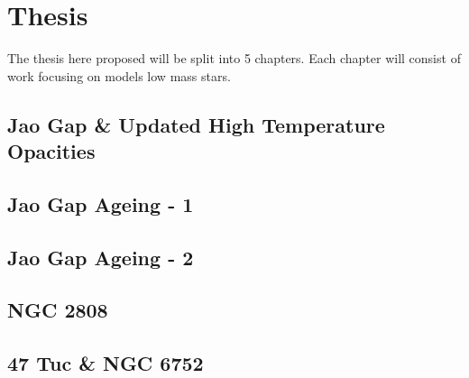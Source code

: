 \section{Thesis}\label{sec:thesis}
The thesis here proposed will be split into 5 chapters. Each chapter will
consist of work focusing on models low mass stars.

\subsection{Jao Gap \& Updated High Temperature Opacities}\label{sec:p1}


\subsection{Jao Gap Ageing - 1}\label{sec:p2}


\subsection{Jao Gap Ageing - 2}\label{sec:p3}


\subsection{NGC 2808}\label{sec:p4}


\subsection{47 Tuc \& NGC 6752}\label{sec:p5}

